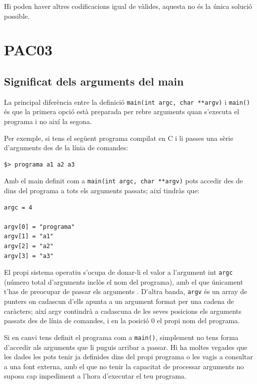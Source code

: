 \documentclass[]{book}
\begin{document}
Hi poden haver altres codificacions igual de vàlides, aquesta no és la
única solució possible.

\chapter{PAC03}\label{pac03}

\section{Significat dels arguments del
main}\label{significat-dels-arguments-del-main}

La principal diferència entre la definició
\texttt{main(int\ argc,\ char\ **argv)} i \texttt{main()} és que la
primera opció està preparada per rebre arguments quan s'executa el
programa i no així la segona.

Per exemple, si tens el següent programa compilat en C i li passes una
sèrie d'arguments des de la línia de comandes:

\begin{verbatim}
$> programa a1 a2 a3
\end{verbatim}

Amb el main definit com a \texttt{main(int\ argc,\ char\ **argv)} pots
accedir des de dins del programa a tots els arguments passats; així
tindràs que:

\begin{verbatim}
argc = 4

argv[0] = "programa"
argv[1] = "a1"
argv[2] = "a2"
argv[3] = "a3"
\end{verbatim}

El propi sistema operatiu s'ocupa de donar-li el valor a l'argument int
\texttt{argc} (número total d'arguments inclòs el nom del programa), amb
el que únicament t'has de preocupar de passar els arguments . D'altra
banda, \texttt{argv} és un array de punters on cadascun d'ells apunta a
un argument format per una cadena de caràcters; així argv contindrà a
cadascuna de les seves posicions els arguments passats des de línia de
comandes, i en la posició 0 el propi nom del programa.

Si en canvi tens definit el programa com a \texttt{main()}, simplement
no tens forma d'accedir als arguments que li puguis arribar a passar. Hi
ha moltes vegades que les dades les pots tenir ja definides dins del
propi programa o les vagis a consultar a una font externa, amb el que no
tenir la capacitat de processar arguments no suposa cap impediment a
l'hora d'executar el teu programa.
\end{document}
